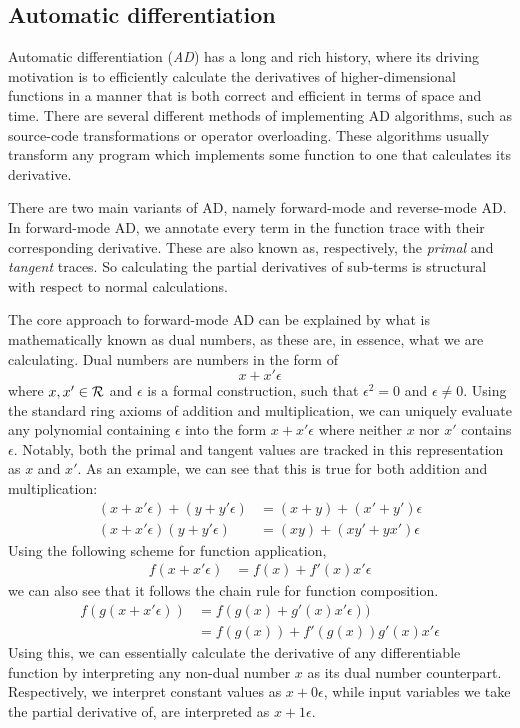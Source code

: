 \subsection{Automatic differentiation}
Automatic differentiation (\textit{AD}) has a long and rich history, where its driving motivation is to efficiently calculate the derivatives of higher-dimensional functions in a manner that is both correct and efficient in terms of space and time\cite{Baydin2015AutomaticDI}.
There are several different methods of implementing AD algorithms, such as source-code transformations or operator overloading.
These algorithms usually transform any program which implements some function to one that calculates its derivative.

There are two main variants of AD, namely forward-mode and reverse-mode AD.
In forward-mode AD, we annotate every term in the function trace with their corresponding derivative.
These are also known as, respectively, the \emph{primal} and \emph{tangent} traces.
So calculating the partial derivatives of sub-terms is structural with respect to normal calculations.

The core approach to forward-mode AD can be explained by what is mathematically known as dual numbers, as these are, in essence, what we are calculating\cite{Baydin2015AutomaticDI}. Dual numbers are numbers in the form of
$$
  x + x' \epsilon
$$
where $x, x' \in \mathcal{R}$ and $\epsilon$ is a formal construction, such that $\epsilon^2 = 0$ and $\epsilon \neq 0$.
Using the standard ring axioms of addition and multiplication, we can uniquely evaluate any polynomial containing $\epsilon$ into the form $x + x'\epsilon$ where neither $x$ nor $x'$ contains $\epsilon$.
Notably, both the primal and tangent values are tracked in this representation as $x$ and $x'$.
As an example, we can see that this is true for both addition and multiplication:
\begin{align*}
  (x + x' \epsilon) + (y + y' \epsilon) &= (x + y) + (x' + y')\epsilon \\
  (x + x' \epsilon)(y + y' \epsilon) &= (xy) + (xy' + yx')\epsilon
\end{align*}
Using the following scheme for function application,
\begin{align*}
  f(x + x' \epsilon) &= f(x) + f'(x)x'\epsilon
\end{align*}
we can also see that it follows the chain rule for function composition.
\begin{align*}
  f(g(x + x' \epsilon)) &= f(g(x) + g'(x)x'\epsilon)) \\
    &= f(g(x)) + f'(g(x))g'(x)x'\epsilon
\end{align*}
Using this, we can essentially calculate the derivative of any differentiable function by interpreting any non-dual number $x$ as its dual number counterpart. Respectively, we interpret constant values as $x + 0\epsilon$, while input variables we take the partial derivative of, are interpreted as $x + 1\epsilon$.

